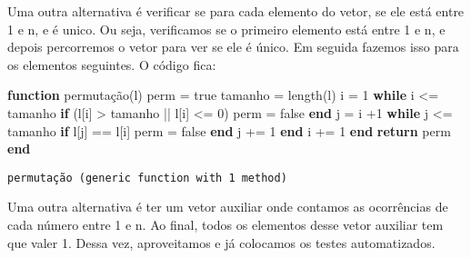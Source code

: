 \documentclass[
  letterpaper,
  DIV=11,
  numbers=noendperiod]{scrreprt}
\newenvironment{Shaded}{\begin{snugshade}}{\end{snugshade}}
\newcommand{\ConstantTok}[1]{\textcolor[rgb]{0.56,0.35,0.01}{#1}}
\newcommand{\ControlFlowTok}[1]{\textcolor[rgb]{0.00,0.23,0.31}{\textbf{#1}}}
\newcommand{\FloatTok}[1]{\textcolor[rgb]{0.68,0.00,0.00}{#1}}
\newcommand{\FunctionTok}[1]{\textcolor[rgb]{0.28,0.35,0.67}{#1}}
\newcommand{\KeywordTok}[1]{\textcolor[rgb]{0.00,0.23,0.31}{\textbf{#1}}}
\newcommand{\NormalTok}[1]{\textcolor[rgb]{0.00,0.23,0.31}{#1}}
\newcommand{\OperatorTok}[1]{\textcolor[rgb]{0.37,0.37,0.37}{#1}}
\begin{document}
Uma outra alternativa é verificar se para cada elemento do vetor, se ele
está entre 1 e n, e é unico. Ou seja, verificamos se o primeiro elemento
está entre 1 e n, e depois percorremos o vetor para ver se ele é único.
Em seguida fazemos isso para os elementos seguintes. O código fica:

\begin{Shaded}
\begin{Highlighting}[]
\KeywordTok{function} \FunctionTok{permutação}\NormalTok{(l)}
\NormalTok{    perm }\OperatorTok{=} \ConstantTok{true}
\NormalTok{    tamanho }\OperatorTok{=} \FunctionTok{length}\NormalTok{(l)}
\NormalTok{    i }\OperatorTok{=} \FloatTok{1}
    \ControlFlowTok{while}\NormalTok{ i }\OperatorTok{\textless{}=}\NormalTok{ tamanho}
        \ControlFlowTok{if}\NormalTok{ (l[i] }\OperatorTok{\textgreater{}}\NormalTok{ tamanho }\OperatorTok{||}\NormalTok{ l[i] }\OperatorTok{\textless{}=} \FloatTok{0}\NormalTok{)}
\NormalTok{            perm }\OperatorTok{=} \ConstantTok{false}
        \ControlFlowTok{end}
\NormalTok{        j }\OperatorTok{=}\NormalTok{ i }\OperatorTok{+}\FloatTok{1}
        \ControlFlowTok{while}\NormalTok{ j }\OperatorTok{\textless{}=}\NormalTok{ tamanho}
            \ControlFlowTok{if}\NormalTok{ l[j] }\OperatorTok{==}\NormalTok{ l[i]}
\NormalTok{                perm }\OperatorTok{=} \ConstantTok{false}
            \ControlFlowTok{end}
\NormalTok{            j }\OperatorTok{+=} \FloatTok{1}
        \ControlFlowTok{end}
\NormalTok{        i }\OperatorTok{+=} \FloatTok{1}
    \ControlFlowTok{end}
    \ControlFlowTok{return}\NormalTok{ perm}
\KeywordTok{end}
\end{Highlighting}
\end{Shaded}

\begin{verbatim}
permutação (generic function with 1 method)
\end{verbatim}

Uma outra alternativa é ter um vetor auxiliar onde contamos as
ocorrências de cada número entre 1 e n. Ao final, todos os elementos
desse vetor auxiliar tem que valer 1. Dessa vez, aproveitamos e já
colocamos os testes automatizados.
\end{document}
